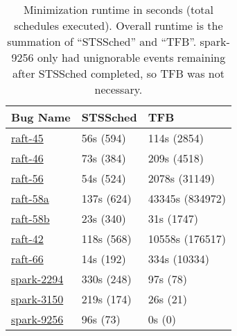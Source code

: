 \begin{table}
\centering
\footnotesize
\begin{tabular}{|l|l|l|}
  \cline{1-3}
  \textbf{Bug Name} &
  \textbf{STSSched} & \textbf{TFB} \\\cline{1-3} \hline
\href{https://docs.google.com/document/d/1alldH4lRSpFQ55-YCNFaIcMpjxrBOMNaB7R_9eEVwfs}{raft-45}
& 56s \hfill (594) & 114s \hfill (2854) \\
\href{https://docs.google.com/document/d/1vhGftMIlmm_uFLmCz2GI0CCPmttDUR617hJ72k2BTbY}{raft-46}
& 73s \hfill (384) & 209s \hfill (4518) \\
\href{https://docs.google.com/document/d/1_UPKhjYoSrG9p4FQXqML_WQKa3WNbM2fch2aa0V-9Go}{raft-56}
& 54s \hfill (524) & 2078s \hfill (31149) \\
\href{https://docs.google.com/document/d/1_efq5rbOGCG3sG-2qxbbOeIRztW9XYP6xgyh0QFmWXg}{raft-58a}
& 137s \hfill (624) & 43345s \hfill (834972) \\
\href{https://docs.google.com/document/d/1eERBdohTC3UidHJ6cZq12ixpp_eiVqzT7LvzuTeEtR4}{raft-58b}
& 23s \hfill (340) & 31s \hfill (1747) \\ %
\href{https://docs.google.com/document/d/1BN4hpTKtN_-inqyT5XTGogI8QSlohnP2Y7A01nuW7TI}{raft-42}
& 118s \hfill (568) & 10558s \hfill (176517) \\
\href{https://docs.google.com/document/d/1lCAR_IE_U27CA-VTlPCi4Kyxf4h6Ykx-0zbkHe0Gfbg}{raft-66}
& 14s \hfill (192) & 334s \hfill (10334) \\ %
\href{https://docs.google.com/document/d/1JQiaLlm6XwLCWKOBOFkaMzg8Gd7NT5gDH3_8OV-oekY}{spark-2294}
& 330s \hfill (248) & 97s \hfill (78)  \\


\href{https://docs.google.com/document/d/1mWbxS2-B0v4fbY_FIASs6HCmAXFh6K89DMYX-XEmeL8}{spark-3150}
& 219s \hfill (174) & 26s \hfill (21) \\ %
\href{https://docs.google.com/document/d/1rPseAbo3FELT8Fj2lrRUMkrDmjLPYI26Jgr8goAMLzU}{spark-9256}
& 96s \hfill (73) & 0s \hfill (0) \\
\hline
\end{tabular}
\caption{Minimization runtime in seconds (total schedules executed). Overall runtime is
the summation of ``STSSched'' and ``TFB''. spark-9256 only
had unignorable events remaining after STSSched completed, so TFB was not
necessary.}
\label{tab:runtime}
\end{table}

